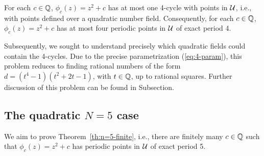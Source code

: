 \begin{theorem}
  For each $c \in \mathbb{Q}$, $\phi_c(z) = z^2 + c$ has at most one 4-cycle
  with points in $\mathcal{U}$, i.e., with points defined over a quadratic
  number field. Consequently, for each $c \in \mathbb{Q}$, $\phi_c(z) = z^2 +
  c$ has at most four periodic points in $\mathcal{U}$ of exact period 4.
\end{theorem}

Subsequently, we sought to understand precisely which quadratic fields
could contain the 4-cycles. Due to the precise parametrization
(\ref{eq:4-param}), this problem reduces to finding rational numbers
of the form $d = (t^4 - 1)(t^2 + 2t - 1)$, with $t \in \mathbb{Q}$, up to
rational squares. Further discussion of this problem can be found in
Subsection.

\subsection{The quadratic $N = 5$ case}
\label{subsec:quadratic-5}

We aim to prove Theorem~\ref{th:n=5-finite}, i.e., there are finitely
many $c \in \mathbb{Q}$ such that $\phi_c(z) = z^2 + c$ has periodic points in
$\mathcal{U}$ of exact period 5.

